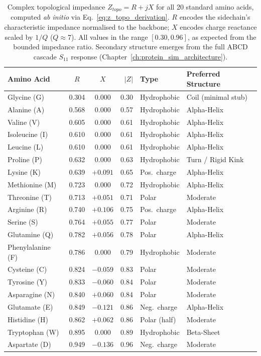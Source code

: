 \begin{table}[H]
\centering
\small
\begin{tabular}{@{}l c c r l l@{}}
\toprule
\textbf{Amino Acid} & $R$ & $X$ & $|Z|$ & \textbf{Type} & \textbf{Preferred Structure} \\
\midrule
Glycine (G)       & 0.304 & 0.000   & 0.30 & Hydrophobic   & Coil (minimal stub) \\
Alanine (A)       & 0.568 & 0.000   & 0.57 & Hydrophobic   & Alpha-Helix \\
Valine (V)        & 0.605 & 0.000   & 0.61 & Hydrophobic   & Alpha-Helix \\
Isoleucine (I)    & 0.610 & 0.000   & 0.61 & Hydrophobic   & Alpha-Helix \\
Leucine (L)       & 0.610 & 0.000   & 0.61 & Hydrophobic   & Alpha-Helix \\
Proline (P)       & 0.632 & 0.000   & 0.63 & Hydrophobic   & Turn / Rigid Kink \\
Lysine (K)        & 0.639 & $+0.091$ & 0.65 & Pos.\ charge  & Alpha-Helix \\
Methionine (M)    & 0.723 & 0.000   & 0.72 & Hydrophobic   & Alpha-Helix \\
Threonine (T)     & 0.713 & $+0.051$ & 0.71 & Polar         & Moderate \\
Arginine (R)      & 0.740 & $+0.106$ & 0.75 & Pos.\ charge  & Alpha-Helix \\
Serine (S)        & 0.764 & $+0.055$ & 0.77 & Polar         & Moderate \\
Glutamine (Q)     & 0.782 & $+0.056$ & 0.78 & Polar         & Alpha-Helix \\
Phenylalanine (F) & 0.786 & 0.000   & 0.79 & Hydrophobic   & Moderate \\
Cysteine (C)      & 0.824 & $-0.059$ & 0.83 & Polar         & Moderate \\
Tyrosine (Y)      & 0.833 & $-0.060$ & 0.84 & Polar         & Moderate \\
Asparagine (N)    & 0.840 & $+0.060$ & 0.84 & Polar         & Moderate \\
Glutamate (E)     & 0.849 & $-0.121$ & 0.86 & Neg.\ charge  & Alpha-Helix \\
Histidine (H)     & 0.862 & $+0.062$ & 0.86 & Polar (half)  & Moderate \\
Tryptophan (W)    & 0.895 & 0.000   & 0.89 & Hydrophobic   & Beta-Sheet \\
Aspartate (D)     & 0.949 & $-0.136$ & 0.96 & Neg.\ charge  & Moderate \\
\bottomrule
\end{tabular}
\caption{Complex topological impedance $Z_{topo} = R + jX$ for all 20 standard amino acids, computed \emph{ab initio} via Eq.~\ref{eq:z_topo_derivation}.  $R$ encodes the sidechain's characteristic impedance normalised to the backbone; $X$ encodes charge reactance scaled by $1/Q$ ($Q \approx 7$).  All values in the range $[0.30, 0.96]$, as expected from the bounded impedance ratio.  Secondary structure emerges from the full ABCD cascade $S_{11}$ response (Chapter~\ref{ch:protein_sim_architecture}).}
\label{tab:z_topo_values}
\end{table}

